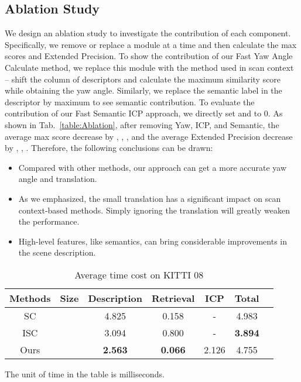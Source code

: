 \documentclass[letterpaper, 10 pt, conference]{ieeeconf}
\begin{document}
\subsection{Ablation Study}
We design an ablation study to investigate the contribution of each component. Specifically, we remove or replace a module at a time and then calculate the  max scores and Extended Precision. To show the contribution of our Fast Yaw Angle Calculate method, we replace this module with the method used in scan context -- shift the column of descriptors and calculate the maximum similarity score while obtaining the yaw angle. Similarly, we replace the semantic label in the descriptor by maximum  to see semantic contribution. To evaluate the contribution of our Fast Semantic ICP approach, we directly set  and  to 0. As shown in Tab.~\ref{table:Ablation}, after removing Yaw, ICP, and Semantic, the average  max score decrease by , , , and the average Extended Precision decrease by , , . Therefore, the following conclusions can be drawn:
\begin{itemize}
     \item Compared with other methods, our approach can get a more accurate yaw angle and translation.
     \item As we emphasized, the small translation has a significant impact on scan context-based methods. Simply ignoring the translation will greatly weaken the performance.
     \item High-level features, like semantics, can bring considerable improvements in the scene description.
\end{itemize}

\begin{table}[t]\footnotesize
    \caption{\centering Average time cost on KITTI 08}\vspace{-3mm}
    \label{table:time}
    \begin{center}
    \begin{threeparttable}
    {
    \begin{tabular}{c c c c c c c}
    \hline
    Methods &Size& Description & Retrieval & ICP & Total\\ 
    \hline
    SC&&4.825&0.158&-&4.983\\
    ISC&&3.094&0.800&-&\textbf{3.894}\\
    Ours&&\textbf{2.563}&\textbf{0.066}&2.126&4.755\\
    \hline
    \end{tabular}
    }
    \begin{tablenotes} 
\footnotesize
            \item The unit of time in the table is milliseconds.
         \end{tablenotes}
    \end{threeparttable}
    \end{center}
    \end{table}
\end{document}
